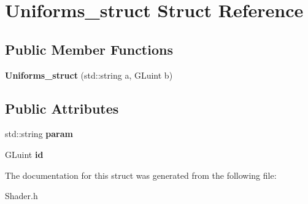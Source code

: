 \hypertarget{structUniforms__struct}{
\section{Uniforms\_\-struct Struct Reference}
\label{structUniforms__struct}
}
\subsection*{Public Member Functions}
\begin{DoxyCompactItemize}
\item 
\hypertarget{structUniforms__struct_a90398a99bea159c4a57b760b72ccb0e8}{
{\bfseries Uniforms\_\-struct} (std::string a, GLuint b)}
\label{structUniforms__struct_a90398a99bea159c4a57b760b72ccb0e8}

\end{DoxyCompactItemize}
\subsection*{Public Attributes}
\begin{DoxyCompactItemize}
\item 
\hypertarget{structUniforms__struct_ad4897a70f6e434ba351109daaa911b82}{
std::string {\bfseries param}}
\label{structUniforms__struct_ad4897a70f6e434ba351109daaa911b82}

\item 
\hypertarget{structUniforms__struct_a1f41d8efb5e158e3d0d6ba5355e79a01}{
GLuint {\bfseries id}}
\label{structUniforms__struct_a1f41d8efb5e158e3d0d6ba5355e79a01}

\end{DoxyCompactItemize}


The documentation for this struct was generated from the following file:\begin{DoxyCompactItemize}
\item 
Shader.h\end{DoxyCompactItemize}
